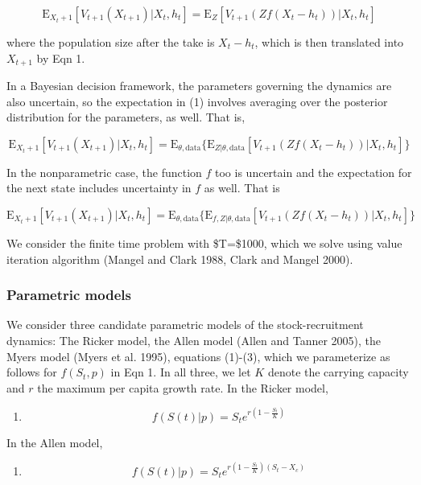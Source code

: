 \documentclass[]{components/elsarticle}
\begin{document}
\[ \mathbf{\mathrm{E}}_{X_t+1} \left[ V_{t+1}( X_{t+1}) | X_t, h_t \right] = \mathbf{\mathrm{E}}_{Z} \left[ V_{t+1}( Z f(X_t - h_t))  | X_t, h_t \right] \]

where the population size after the take is $X_t-h_t$, which is then
translated into $X_{t+1}$ by Eqn 1.

In a Bayesian decision framework, the parameters governing the dynamics
are also uncertain, so the expectation in (1) involves averaging over
the posterior distribution for the parameters, as well. That is,

\[\mathbf{\mathrm{E}}_{X_t+1} \left[ V_{t+1}( X_{t+1}) | X_t, h_t \right] = \mathbf{\mathrm{E}}_{\theta,\mathrm{data}} \{ \mathbf{\mathrm{E}}_{Z | \theta, \mathrm{data}} \left[ V_{t+1}( Z f(X_t - h_t))  | X_t, h_t \right] \}\]

In the nonparametric case, the function $f$ too is uncertain and the
expectation for the next state includes uncertainty in $f$ as well. That
is

\[\mathbf{\mathrm{E}}_{X_t+1} \left[ V_{t+1}( X_{t+1}) | X_t, h_t \right] = \mathbf{\mathrm{E}}_{\theta,\mathrm{data}} \{ \mathbf{\mathrm{E}}_{f, Z | \theta, \mathrm{data}} \left[ V_{t+1}( Z f(X_t - h_t))  | X_t, h_t \right] \}\]

We consider the finite time problem with \$T=\$1000, which we solve
using value iteration algorithm (Mangel and Clark 1988, Clark and Mangel
2000).

\subsubsection{Parametric models}\label{parametric-models}

We consider three candidate parametric models of the stock-recruitment
dynamics: The Ricker model, the Allen model (Allen and Tanner 2005), the
Myers model (Myers et al. 1995), equations (1)-(3), which we
parameterize as follows for $f(S_t,p)$ in Eqn 1. In all three, we let
$K$ denote the carrying capacity and $r$ the maximum per capita growth
rate. In the Ricker model,

\begin{enumerate}
\def\labelenumi{(\arabic{enumi})}
\itemsep1pt\parskip0pt
\item
  \[ f(S(t)|p) = S_t e^{r \left(1 - \frac{S_t}{K} \right) } \]
\end{enumerate}

In the Allen model,

\begin{enumerate}
\def\labelenumi{(\arabic{enumi})}
\setcounter{enumi}{1}
\itemsep1pt\parskip0pt
\item
  \[ f(S(t)|p) = S_t e^{r \left(1 - \frac{S_t}{K}\right)\left(S_t - X_c\right)} \]
\end{enumerate}
\end{document}
